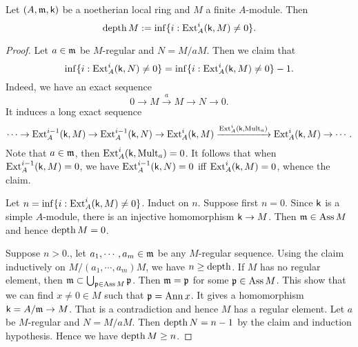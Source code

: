 
    \begin{proposition}\label{prop: depth equals to grade}
        Let $(A, {\mathfrak{m}}, {\mathsf{k}})$ be a noetherian local ring and $M$ a finite $A$-module.
        Then 
        \[ \operatorname{depth} M := \inf \{ i : \operatorname{Ext}^i_A({\mathsf{k}},M) \neq 0 \}. \]
    \end{proposition}
    \begin{proof}
        Let $a \in {\mathfrak{m}}$ be $M$-regular and $N = M/aM$.
        Then we claim that
        \[ \inf \{ i: \operatorname{Ext}^i_A({\mathsf{k}},N) \neq 0 \} = \inf \{ i : \operatorname{Ext}^i_A({\mathsf{k}},M) \neq 0 \} - 1. \]
        Indeed, we have an exact sequence
        \[ 0 \to M \xrightarrow{a} M \to N \to 0. \]
        It induces a long exact sequence
        \[ \cdots \to \operatorname{Ext}^{i-1}_A({\mathsf{k}},M) \to \operatorname{Ext}^{i-1}_A({\mathsf{k}},N) \to \operatorname{Ext}^i_A({\mathsf{k}},M) \xrightarrow{\operatorname{Ext}^i_A({\mathsf{k}},\operatorname{Mult}_a)} \operatorname{Ext}^i_A({\mathsf{k}},M) \to \cdots. \]
        Note that $a \in {\mathfrak{m}}$, then $\operatorname{Ext}^i_A({\mathsf{k}},\operatorname{Mult}_a) = 0$.
        It follows that when $\operatorname{Ext}^{i-1}_A({\mathsf{k}},M) = 0$, we have $\operatorname{Ext}^{i-1}_A({\mathsf{k}},N) = 0$ iff $\operatorname{Ext}^i_A({\mathsf{k}},M) = 0$, whence the claim.

        Let $n = \inf \{ i : \operatorname{Ext}^i_A({\mathsf{k}},M) \neq 0 \}$.
        Induct on $n$.
        Suppose first $n = 0$.
        Since ${\mathsf{k}}$ is a simple $A$-module, there is an injective homomorphism ${\mathsf{k}} \to M$.
        Then ${\mathfrak{m}} \in \operatorname{Ass} M$ and hence $\operatorname{depth} M = 0$.
        
        Suppose $n > 0$., let $a_1,\cdots,a_m \in {\mathfrak{m}}$ be any $M$-regular sequence.
        Using the claim inductively on $M/(a_1,\cdots,a_m)M$, we have $n \geq \operatorname{depth}$.
        If $M$ has no regular element, then ${\mathfrak{m}} \subset \bigcup_{{\mathfrak{p}} \in \operatorname{Ass} M} {\mathfrak{p}}$.
        Then ${\mathfrak{m}} = {\mathfrak{p}}$ for some ${\mathfrak{p}} \in \operatorname{Ass} M$.
        This show that we can find $x \neq 0 \in M$ such that ${\mathfrak{p}} = \operatorname{Ann} x$.
        It gives a homomorphism ${\mathsf{k}} = A/{\mathfrak{m}} \to M$.
        That is a contradiction and hence $M$ has a regular element.
        Let $a$ be $M$-regular and $N = M/aM$.
        Then $\operatorname{depth} N = n-1$ by the claim and induction hypothesis.
        Hence we have $\operatorname{depth} M \geq n$.
    \end{proof}


